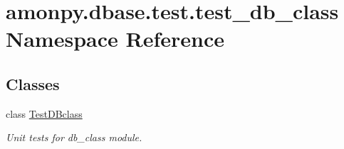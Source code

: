 \hypertarget{namespaceamonpy_1_1dbase_1_1test_1_1test__db__class}{\section{amonpy.\-dbase.\-test.\-test\-\_\-db\-\_\-class Namespace Reference}
\label{namespaceamonpy_1_1dbase_1_1test_1_1test__db__class}
}
\subsection*{Classes}
\begin{DoxyCompactItemize}
\item 
class \hyperlink{classamonpy_1_1dbase_1_1test_1_1test__db__class_1_1_test_d_bclass}{Test\-D\-Bclass}
\begin{DoxyCompactList}\small\item\em Unit tests for db\-\_\-class module. \end{DoxyCompactList}\end{DoxyCompactItemize}
